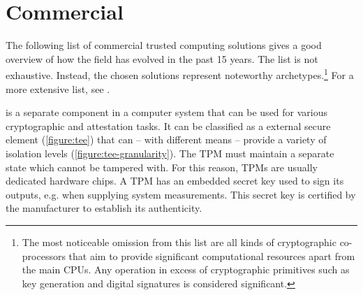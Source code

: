 \section{Commercial\label{ID_1886048225}}
The following list of commercial trusted computing solutions gives a good overview of how the field has evolved in the past 15 years.\label{ID_642511098}
The list is not exhaustive. Instead, the chosen solutions represent noteworthy archetypes.\footnote{The most noticeable omission from this list are all kinds of cryptographic co-processors that aim to provide significant computational resources apart from the main CPUs. Any operation in excess of cryptographic primitives such as key generation and digital signatures is considered significant.} For a more extensive list, see \cite{tee_mobile_devices}.\label{ID_727374297}
\begin{description}\label{ID_838567667}
\item[2002: Trusted Platform Module (TPM)\footnotemark]\label{ID_878785835}
\label{ID_1084798609}
is a separate component in a computer system that can be used for various cryptographic and attestation tasks.\cite[]{tcg:tpm2-arch}\label{ID_409429025}
It can be classified as a external secure element (\autoref{figure:tee}) that can -- with different means -- provide a variety of isolation levels (\autoref{figure:tee-granularity}).\label{ID_1604168991}
The TPM must maintain a separate state which cannot be tampered with. For this reason, TPMs are usually dedicated hardware chips.\footnotemark\label{ID_461477657}
\label{ID_1882630870}
A TPM has an embedded secret key used to sign its outputs, e.g. when supplying system measurements. This secret key is certified by the manufacturer to establish its authenticity.\cite[]{tcg:tpm1-design}\label{ID_34222075}


\end{description}
